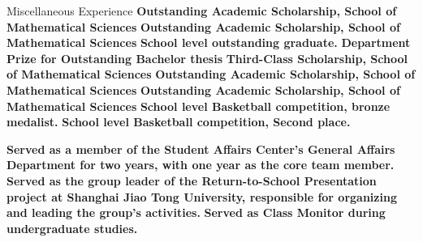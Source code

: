 \begin{rubric}{Miscellaneous Experience}
\entry*[2026] \textbf{Outstanding Academic Scholarship, School of Mathematical Sciences}
\entry*[2025] \textbf{Outstanding Academic Scholarship, School of Mathematical Sciences}
\entry*[2024] \textbf{ School level outstanding graduate.
}%
\entry*[2024] \textbf{Department Prize for Outstanding Bachelor thesis}
\entry*[2023]\textbf{Third-Class Scholarship, School of Mathematical Sciences}
\entry*[2022] \textbf{Outstanding Academic Scholarship, School of Mathematical Sciences}
\entry*[2021] \textbf{Outstanding Academic Scholarship, School of Mathematical Sciences}
\entry*[2021] \textbf{School level Basketball competition, bronze medalist.}
\entry*[2020] \textbf{School level Basketball competition, Second place.}


\entry*[2021-2024] \textbf{Served as a member of the Student Affairs Center's General Affairs Department for two years, with one year as the core team member.} %
\entry*[2022] \textbf{Served as the group leader of the Return-to-School Presentation project at Shanghai Jiao Tong University, responsible for organizing and leading the group’s activities.}
\entry*[2020-2024]\textbf{Served as  Class Monitor during undergraduate studies.}
\end{rubric}